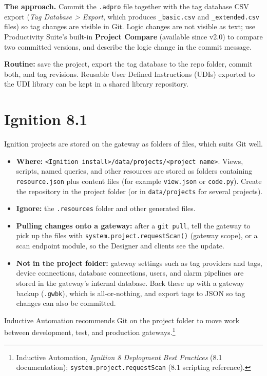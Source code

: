 \textbf{The approach.} Commit the \texttt{.adpro} file together with the tag database CSV export (\textit{Tag Database \textgreater{} Export}, which produces \texttt{\_basic.csv} and \texttt{\_extended.csv} files) so tag changes are visible in Git. Logic changes are not visible as text; use Productivity Suite's built-in \textbf{Project Compare} (available since v2.0) to compare two committed versions, and describe the logic change in the commit message.

\textbf{Routine:} save the project, export the tag database to the repo folder, commit both, and tag revisions. Reusable User Defined Instructions (UDIs) exported to the UDI library can be kept in a shared library repository.

\section{Ignition 8.1}
Ignition projects are stored on the gateway as folders of files, which suits Git well.
\begin{itemize}[itemsep=1pt]
  \item \textbf{Where:} \texttt{<Ignition install>/\allowbreak{}data/\allowbreak{}projects/\allowbreak{}<project name>}. Views, scripts, named queries, and other resources are stored as folders containing \texttt{resource.json} plus content files (for example \texttt{view.json} or \texttt{code.py}). Create the repository in the project folder (or in \texttt{data/projects} for several projects).
  \item \textbf{Ignore:} the \texttt{.resources} folder and other generated files.
  \item \textbf{Pulling changes onto a gateway:} after a \texttt{git pull}, tell the gateway to pick up the files with \texttt{system.\allowbreak{}project.\allowbreak{}requestScan()} (gateway scope), or a scan endpoint module, so the Designer and clients see the update.
  \item \textbf{Not in the project folder:} gateway settings such as tag providers and tags, device connections, database connections, users, and alarm pipelines are stored in the gateway's internal database. Back these up with a gateway backup (\texttt{.gwbk}), which is all-or-nothing, and export tags to JSON so tag changes can also be committed.
\end{itemize}
Inductive Automation recommends Git on the project folder to move work between development, test, and production gateways.\footnote{Inductive Automation, \emph{Ignition 8 Deployment Best Practices} (8.1 documentation); \texttt{system.\allowbreak{}project.\allowbreak{}requestScan} (8.1 scripting reference).}

